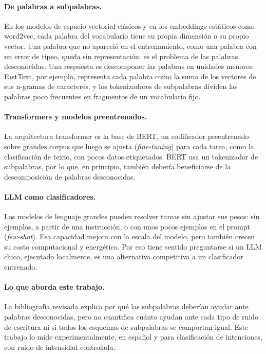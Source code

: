 \documentclass[11pt,a4paper]{article}
\begin{document}
\paragraph{De palabras a subpalabras.} En los modelos de espacio vectorial clásicos y en los
embeddings estáticos como word2vec, cada palabra del
vocabulario tiene su propia dimensión o su propio vector. Una palabra que no apareció en el
entrenamiento, como una palabra con un error de tipeo, queda sin representación: es el problema
de las palabras desconocidas. Una respuesta es descomponer las palabras en unidades menores.
FastText, por ejemplo, representa cada palabra como la suma de los vectores de sus n-gramas de
caracteres, y los tokenizadores de subpalabras dividen las palabras poco frecuentes en
fragmentos de un vocabulario fijo.

\paragraph{Transformers y modelos preentrenados.} La arquitectura transformer es la base de
BERT, un codificador preentrenado sobre grandes corpus que luego se ajusta (\emph{fine-tuning})
para cada tarea, como la clasificación de texto, con pocos datos etiquetados. BERT usa un tokenizador de subpalabras, por lo que, en principio, también
debería beneficiarse de la descomposición de palabras desconocidas.

\paragraph{LLM como clasificadores.} Los modelos de lenguaje grandes pueden resolver tareas sin
ajustar sus pesos: sin ejemplos, a partir de una instrucción, o con unos pocos ejemplos en el
prompt (\emph{few-shot}). Esa capacidad mejora con la escala del modelo, pero también crecen su
costo computacional y energético. Por eso tiene sentido
preguntarse si un LLM chico, ejecutado localmente, es una alternativa competitiva a un
clasificador entrenado.

\paragraph{Lo que aborda este trabajo.} La bibliografía revisada explica por qué las
subpalabras deberían ayudar ante palabras desconocidas, pero no cuantifica cuánto ayudan ante
cada tipo de ruido de escritura ni si todos los esquemas de subpalabras se comportan igual.
Este trabajo lo mide experimentalmente, en español y para clasificación de intenciones, con
ruido de intensidad controlada.
\end{document}
